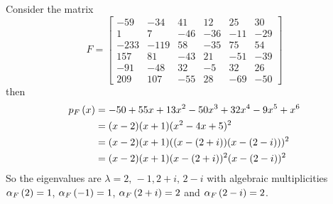\documentclass{ximera}
\begin{document}
\begin{example}

  Consider the matrix
  \[
    F=
    \begin{bmatrix}
      -59 & -34 & 41 & 12 & 25 & 30\\
      1 & 7 & -46 & -36 & -11 & -29\\
      -233 & -119 & 58 & -35 & 75 & 54\\
      157 & 81 & -43 & 21 & -51 & -39\\
      -91 & -48 & 32 & -5 & 32 & 26\\
      209 & 107 & -55 & 28 & -69 & -50
    \end{bmatrix}
  \]
  then
  \begin{align*}
    p_{F}\left(x\right)&=-50+55x+13x^2-50x^3+32x^4-9x^5+x^6\\
                   &=(x-2)(x+1)(x^2-4x+5)^2\\
                   &=(x-2)(x+1)((x-(2+i))(x-(2-i)))^2\\
                   &=(x-2)(x+1)(x-(2+i))^2(x-(2-i))^2\\
  \end{align*}
  So the eigenvalues are $\lambda=2,\,-1,2+i,\,2-i$ with algebraic
  multiplicities $\alpha_{F}\left(2\right)=1$, $\alpha_{F}\left(-1\right)=1$,
  $\alpha_{F}\left(2+i\right)=2$ and $\alpha_{F}\left(2-i\right)=2$.


\end{example}
\end{document}
